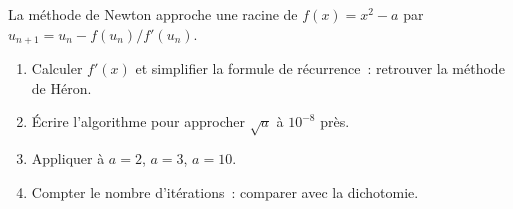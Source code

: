 \begin{challenge}
La m\'ethode de Newton approche une racine de $f(x)=x^2-a$ par $u_{n+1}=u_n-f(u_n)/f'(u_n)$.
\begin{enumerate}
  \item Calculer $f'(x)$ et simplifier la formule de r\'ecurrence~:
        retrouver la m\'ethode de H\'eron.
  \item \'Ecrire l'algorithme pour approcher $\sqrt{a}$ \`a $10^{-8}$ pr\`es.
  \item Appliquer \`a $a=2$, $a=3$, $a=10$.
  \item Compter le nombre d'it\'erations~: comparer avec la dichotomie.
\end{enumerate}
\end{challenge}

